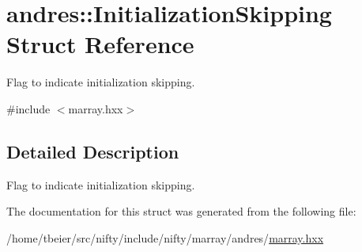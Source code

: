 \hypertarget{structandres_1_1InitializationSkipping}{}\section{andres\+:\+:Initialization\+Skipping Struct Reference}
\label{structandres_1_1InitializationSkipping}


Flag to indicate initialization skipping.  




{\ttfamily \#include $<$marray.\+hxx$>$}



\subsection{Detailed Description}
Flag to indicate initialization skipping. 

The documentation for this struct was generated from the following file\+:\begin{DoxyCompactItemize}
\item 
/home/tbeier/src/nifty/include/nifty/marray/andres/\hyperlink{andres_2marray_8hxx}{marray.\+hxx}\end{DoxyCompactItemize}
